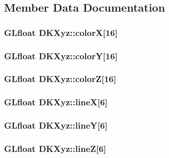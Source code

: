 \subsection{Member Data Documentation}
\hypertarget{class_d_k_xyz_af13cecd85d6408ee8c79cfef2ea8eb72}{
\subsubsection[{color\-X}]{\setlength{\rightskip}{0pt plus 5cm}G\-Lfloat D\-K\-Xyz\-::color\-X\mbox{[}16\mbox{]}}}\label{class_d_k_xyz_af13cecd85d6408ee8c79cfef2ea8eb72}
\hypertarget{class_d_k_xyz_a3542bba8788158a8446df80dde93782f}{
\subsubsection[{color\-Y}]{\setlength{\rightskip}{0pt plus 5cm}G\-Lfloat D\-K\-Xyz\-::color\-Y\mbox{[}16\mbox{]}}}\label{class_d_k_xyz_a3542bba8788158a8446df80dde93782f}
\hypertarget{class_d_k_xyz_aec9854db6b80b43d01794bbdd66d0642}{
\subsubsection[{color\-Z}]{\setlength{\rightskip}{0pt plus 5cm}G\-Lfloat D\-K\-Xyz\-::color\-Z\mbox{[}16\mbox{]}}}\label{class_d_k_xyz_aec9854db6b80b43d01794bbdd66d0642}
\hypertarget{class_d_k_xyz_ae26ade46ab059bccc0b398ce46f2a218}{
\subsubsection[{line\-X}]{\setlength{\rightskip}{0pt plus 5cm}G\-Lfloat D\-K\-Xyz\-::line\-X\mbox{[}6\mbox{]}}}\label{class_d_k_xyz_ae26ade46ab059bccc0b398ce46f2a218}
\hypertarget{class_d_k_xyz_a6150491e6a7cda2eafeefbd30133bda8}{
\subsubsection[{line\-Y}]{\setlength{\rightskip}{0pt plus 5cm}G\-Lfloat D\-K\-Xyz\-::line\-Y\mbox{[}6\mbox{]}}}\label{class_d_k_xyz_a6150491e6a7cda2eafeefbd30133bda8}
\hypertarget{class_d_k_xyz_aabf893ac3435776b8a9283226a4a8881}{
\subsubsection[{line\-Z}]{\setlength{\rightskip}{0pt plus 5cm}G\-Lfloat D\-K\-Xyz\-::line\-Z\mbox{[}6\mbox{]}}}\label{class_d_k_xyz_aabf893ac3435776b8a9283226a4a8881}


